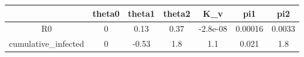 \begin{tabular}{|c|c|c|c|c|c|c|}
\hline
& theta0 & theta1 & theta2 & K_v & pi1 & pi2 \\
\hline
R0 & 0 & 0.13 & 0.37 & -2.8e-08 & 0.00016 & 0.0033 \\
\hline
cumulative_infected & 0 & -0.53 & 1.8 & 1.1 & 0.021 & 1.8 \\
\hline
\end{tabular}
